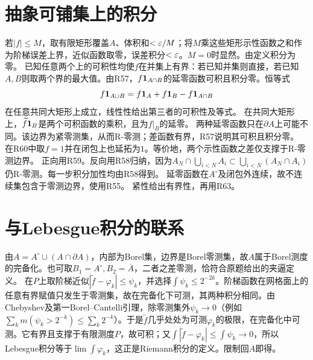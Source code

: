 \documentclass[UTF8,fontset=fandol,11pt]{ctexart}
\begin{document}
\section{抽象可铺集上的积分}
若$|f|\le M$，取有限矩形覆盖$A$、体积和$<\varepsilon/M$；将$M$乘这些矩形示性函数之和作为阶梯误差上界，近似函数取零，误差积分$<\varepsilon$。$M=0$时显然。由定义积分为零。
已知任意两个上的可积性均使$f$在并集上有界：若已知并集则直接，若已知$A,B$则取两个界的最大值。由R57，$f\mathbf1_{A\cap B}$的延零函数可积且积分零。恒等式
\[f\mathbf1_{A\cup B}=f\mathbf1_A+f\mathbf1_B-f\mathbf1_{A\cap B}\]
在任意共同大矩形上成立，线性性给出第三者的可积性及等式。
在共同大矩形上，$\widetilde f\mathbf1_B$是两个可积函数的乘积，且为$f|_B$的延零。
两种延零函数只在$\partial A$上可能不同。该边界为紧零测集，从而R-零测；差函数有界，R57说明其可积且积分零。
在R60中取$f=1$并在闭包上也延拓为$1$。等价地，两个示性函数之差仅支撑于R-零测边界。
正向用R59。反向用R58归纳，因为$A_N\cap\bigcup_{i<N}A_i\subset\bigcup_{i<N}(A_N\cap A_i)$仍R-零测。每一步积分加性均由R58得到。
延零函数在$A^\circ$及闭包外连续，故不连续集包含于零测边界，使用R55。
紧性给出有界性，再用R63。
\section{与Lebesgue积分的联系}
由$A=A^\circ\cup(A\cap\partial A)$，内部为Borel集，边界是Borel零测集，故$A$属于Borel测度的完备化。也可取$B_1=A^\circ,B_2=\overline A$，二者之差零测，恰符合原题给出的夹逼定义。
在$P$上取阶梯近似$|\widetilde f-\varphi_k|\le\psi_k$，并选择$\int\psi_k\le2^{-2k}$。阶梯函数在网格面上的任意有界赋值只发生于零测集，故在完备化下可测，其两种积分相同。由Chebyshev及第一Borel--Cantelli引理，除零测集外$\psi_k\to0$（例如$\sum_km(\psi_k>2^{-k})\le\sum_k2^{-k}$）。于是$\widetilde f$几乎处处为可测$\varphi_k$的极限，在完备化中可测。它有界且支撑于有限测度$P$，故可积；又$\int|\widetilde f-\varphi_k|\le\int\psi_k\to0$，所以Lebesgue积分等于$\lim\int\varphi_k$，这正是Riemann积分的定义。限制回$A$即得。
\originalpages
\end{document}
